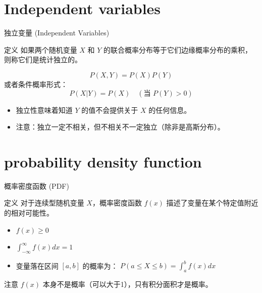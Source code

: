 \documentclass[12pt, t, aspectratio=169]{beamer}
\begin{document}
\section{Independent variables}
\begin{frame}{独立变量 (Independent Variables)}
    \begin{block}{定义}
        如果两个随机变量 $X$ 和 $Y$ 的联合概率分布等于它们边缘概率分布的乘积，则称它们是统计独立的。
    \end{block}
    
    \begin{equation*}
        P(X, Y) = P(X)P(Y)
    \end{equation*}
    或者条件概率形式：
    \begin{equation*}
        P(X|Y) = P(X) \quad (\text{当 } P(Y) > 0)
    \end{equation*}
    
    \vspace{0.5cm}
    \begin{itemize}
        \item 独立性意味着知道 $Y$ 的值不会提供关于 $X$ 的任何信息。
        \item 注意：独立一定不相关，但不相关不一定独立（除非是高斯分布）。
    \end{itemize}
\end{frame}

\section{probability density function}
\begin{frame}{概率密度函数 (PDF)}
    \begin{block}{定义}
        对于连续型随机变量 $X$，概率密度函数 $f(x)$ 描述了变量在某个特定值附近的相对可能性。
    \end{block}
    
    \begin{itemize}
        \item $f(x) \geq 0$
        \item $\int_{-\infty}^{\infty} f(x) dx = 1$
        \item 变量落在区间 $[a, b]$ 的概率为：
         $\displaystyle   P(a \leq X \leq b) = \int_{a}^{b} f(x) dx$
    \end{itemize}
    
    \vspace{0.2cm}
    \begin{alertblock}{注意}
        $f(x)$ 本身不是概率（可以大于1），只有积分面积才是概率。
    \end{alertblock}
\end{frame}
\end{document}
